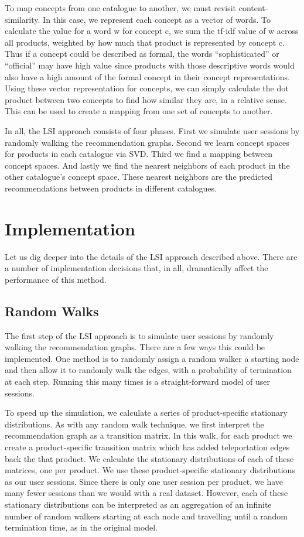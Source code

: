 \documentclass[11pt]{article}
\begin{document}
To map concepts from one catalogue to another, we must revisit
content-similarity. In this case, we represent each concept as a vector of
words. To calculate the value for a word w for concept c, we sum the tf-idf
value of w across all products, weighted by how much that product is represented
by concept c. Thus if a concept could be described as formal, the words
``sophisticated'' or ``official'' may have high value since products with those
descriptive words would also have a high amount of the formal concept in their
concept representations. Using these vector representation for concepts, we can
simply calculate the dot product between two concepts to find how similar they
are, in a relative sense. This can be used to create a mapping from one set of
concepts to another.

In all, the LSI approach consists of four phases. First we simulate user
sessions by randomly walking the recommendation graphs. Second we learn concept
spaces for products in each catalogue via SVD. Third we find a mapping between
concept spaces. And lastly we find the nearest neighbors of each product in the
other catalogue's concept space. These nearest neighbors are the predicted
recommendations between products in different catalogues.

\section*{Implementation}
Let us dig deeper into the details of the LSI approach described above. There 
are a number of implementation decisions that, in all, dramatically affect the
performance of this method.

\subsection*{Random Walks}
The first step of the LSI approach is to simulate user sessions by randomly
walking the recommendation graphs. There are a few ways this could be implemented.
One method is to randomly assign a random walker a starting node and then allow
it to randomly walk the edges, with a probability of termination at each step.
Running this many times is a straight-forward model of user sessions.

To speed up the simulation, we calculate a series of product-specific stationary
distributions. As with any random walk technique, we first interpret the 
recommendation graph as a transition matrix. In this walk, for each product we create a
product-specific transition matrix which has added teleportation edges back the
that product. We calculate the stationary distributions of each of these
matrices, one per product. We use these product-specific stationary
distributions as our user sessions. Since there is only one user session per 
product, we have many fewer sessions than we would with a real dataset. However,
each of these stationary distributions can be interpreted as an aggregation of
an infinite number of random walkers starting at each node and travelling until
a random termination time, as in the original model.
\end{document}
